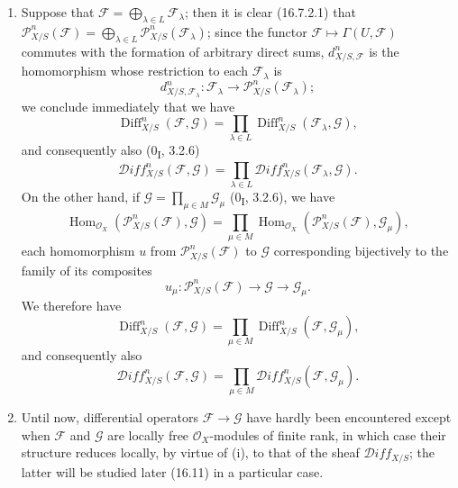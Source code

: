 \begin{remarks}[16.8.11]
\label{IV.16.8.11}
\begin{enumerate}
  \item[(i)] Suppose that
  $\mathscr{F}=\bigoplus_{\lambda\in L}\mathscr{F}_\lambda$; then it is
  clear (16.7.2.1) that
  $\mathscr{P}_{X/S}^n(\mathscr{F})=
  \bigoplus_{\lambda\in L}\mathscr{P}_{X/S}^n(\mathscr{F}_\lambda)$; since the
  functor $\mathscr{F}\mapsto\Gamma(U,\mathscr{F})$ commutes with the formation
  of arbitrary direct sums, $d_{X/S,\mathscr{F}}^n$ is
  the homomorphism whose restriction to each $\mathscr{F}_\lambda$ is
  \[
    d_{X/S,\mathscr{F}_\lambda}^n:\mathscr{F}_\lambda
    \longrightarrow\mathscr{P}_{X/S}^n(\mathscr{F}_\lambda);
  \]
  we conclude immediately that we have
  \[
    \operatorname{Diff}_{X/S}^n(\mathscr{F},\mathscr{G})
    =\prod_{\lambda\in L}
    \operatorname{Diff}_{X/S}^n(\mathscr{F}_\lambda,\mathscr{G}),
  \]
  and consequently also (0\textsubscript{I}, 3.2.6)
  \[
    \mathscr{D}\!iff_{X/S}^n(\mathscr{F},\mathscr{G})
    =\prod_{\lambda\in L}
    \mathscr{D}\!iff_{X/S}^n(\mathscr{F}_\lambda,\mathscr{G}).
  \]
  On the other hand, if $\mathscr{G}=\prod_{\mu\in M}\mathscr{G}_\mu$
  (0\textsubscript{I}, 3.2.6), we have
  \[
    \operatorname{Hom}_{\mathcal{O}_X}
    (\mathscr{P}_{X/S}^n(\mathscr{F}),\mathscr{G})
    =\prod_{\mu\in M}\operatorname{Hom}_{\mathcal{O}_X}
    (\mathscr{P}_{X/S}^n(\mathscr{F}),\mathscr{G}_\mu),
  \]
  each homomorphism $u$ from $\mathscr{P}_{X/S}^n(\mathscr{F})$ to
  $\mathscr{G}$ corresponding bijectively to the family of its composites
  \[
    u_\mu:\mathscr{P}_{X/S}^n(\mathscr{F})
    \longrightarrow\mathscr{G}\longrightarrow\mathscr{G}_\mu.
  \]
  We therefore have
  \[
    \operatorname{Diff}_{X/S}^n(\mathscr{F},\mathscr{G})
    =\prod_{\mu\in M}
    \operatorname{Diff}_{X/S}^n(\mathscr{F},\mathscr{G}_\mu),
  \]
  and consequently also
  \[
    \mathscr{D}\!iff_{X/S}^n(\mathscr{F},\mathscr{G})
    =\prod_{\mu\in M}
    \mathscr{D}\!iff_{X/S}^n(\mathscr{F},\mathscr{G}_\mu).
  \]
  \item[(ii)] Until now, differential operators
  $\mathscr{F}\to\mathscr{G}$ have hardly been encountered except when
  $\mathscr{F}$ and $\mathscr{G}$ are locally free $\mathcal{O}_X$-modules of
  finite rank, in which case their structure reduces locally, by virtue
  of (i), to that of the sheaf $\mathscr{D}\!iff_{X/S}$; the latter will be
  studied later (16.11) in a particular case.
\end{enumerate}
\end{remarks}


